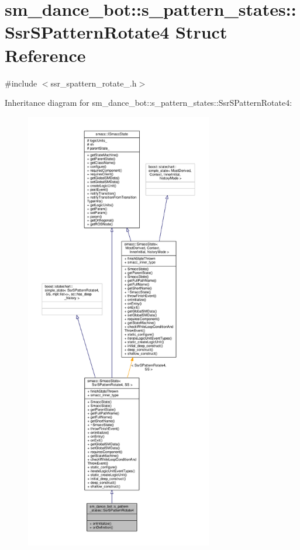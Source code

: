 \hypertarget{structsm__dance__bot_1_1s__pattern__states_1_1SsrSPatternRotate4}{}\section{sm\+\_\+dance\+\_\+bot\+:\+:s\+\_\+pattern\+\_\+states\+:\+:Ssr\+S\+Pattern\+Rotate4 Struct Reference}
\label{structsm__dance__bot_1_1s__pattern__states_1_1SsrSPatternRotate4}


{\ttfamily \#include $<$ssr\+\_\+spattern\+\_\+rotate\+\_.\+h$>$}



Inheritance diagram for sm\+\_\+dance\+\_\+bot\+:\+:s\+\_\+pattern\+\_\+states\+:\+:Ssr\+S\+Pattern\+Rotate4\+:\nopagebreak
\begin{figure}[H]
\begin{center}
\leavevmode
\includegraphics[height=550pt]{structsm__dance__bot_1_1s__pattern__states_1_1SsrSPatternRotate4__inherit__graph}
\end{center}
\end{figure}


